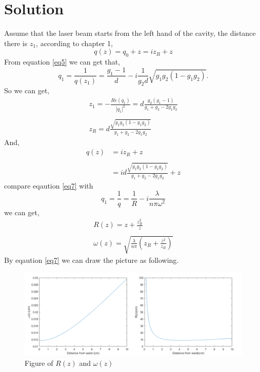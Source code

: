 \documentclass{article}
\begin{document}
\section*{Solution}
Assume that the laser beam starts from the left hand of the cavity, the distance there is $z_1$, according to chapter 1,
\begin{equation}
	q(z)=q_0+z=i z_R+z
\end{equation}
From equation \ref{eq5} we can get that,
\begin{equation}
	q_1=\frac{1}{q(z_1)}=\frac{g_1-1}{d}- i\frac{1}{g_2d}\sqrt{g_{1}g_{2}(1-g_1g_{2})}.
\end{equation}
So we can get,
\begin{equation}\label{eq6}
	\begin{array}{l}
		z_1=-\frac{Re(q_1)}{|q_1|^2}=d\frac{g_2(g_1-1)}{g_1+g_2-2g_1g_2}\\
		\\
		z_R=d\frac{\sqrt{g_1g_2(1-g_1g_2)}}{g_1+g_2-2g_1g_2}
	\end{array}
\end{equation}
And,
\begin{equation}\label{eq7}
	\begin{aligned}
		q(z)&=i z_R+z \\
		\\
		&=i d\frac{\sqrt{g_1g_2(1-g_1g_2)}}{g_1+g_2-2g_1g_2}+z
	\end{aligned}
\end{equation}
compare eqaution \ref{eq7} with
$$
q_1=\frac{1}{q}=\frac{1}{R}-i\frac{\lambda}{n\pi\omega^2}
$$
we can get,
\begin{equation}\label{eq8}
	\begin{array}{l}
		R(z)=z+\frac{z_R^2}{z}\\
		\\
		\omega(z)=\sqrt{\frac{\lambda}{n\pi}(z_R+\frac{z^2}{z_R})}
	\end{array}
\end{equation}
By eqaution \ref{eq7} we can draw the picture as following.
\begin{figure}[h]
	\centering
	\includegraphics[width=14cm]{figure.png}
	\caption{Figure of $R(z)$ and $\omega(z)$}
\end{figure}
\end{document}
